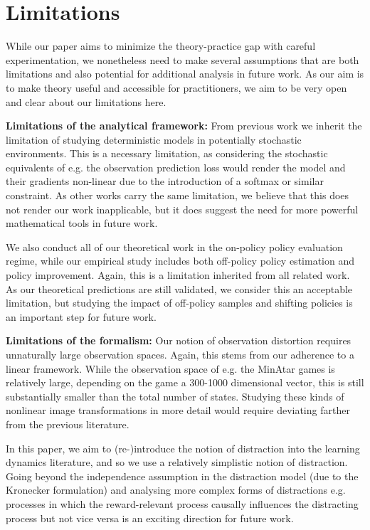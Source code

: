 \section{Limitations}
\label{app:limitations}

While our paper aims to minimize the theory-practice gap with careful experimentation, we nonetheless need to make several assumptions that are both limitations and also potential for additional analysis in future work.
As our aim is to make theory useful and accessible for practitioners, we aim to be very open and clear about our limitations here.

\textbf{Limitations of the analytical framework:} From previous work \parencite{tang2022understanding,lelan2023bootstrapped} we inherit the limitation of studying deterministic models in potentially stochastic environments.
This is a necessary limitation, as considering the stochastic equivalents of e.g. the observation prediction loss would render the model and their gradients non-linear due to the introduction of a softmax or similar constraint.
As other works carry the same limitation, we believe that this does not render our work inapplicable, but it does suggest the need for more powerful mathematical tools in future work.

We also conduct all of our theoretical work in the on-policy policy evaluation regime, while our empirical study includes both off-policy policy estimation and policy improvement.
Again, this is a limitation inherited from all related work.
As our theoretical predictions are still validated, we consider this an acceptable limitation, but studying the impact of off-policy samples and shifting policies is an important step for future work.

\textbf{Limitations of the formalism:} Our notion of observation distortion requires unnaturally large observation spaces. Again, this stems from our adherence to a linear framework.
While the observation space of e.g. the MinAtar games is relatively large, depending on the game a 300-1000 dimensional vector, this is still substantially smaller than the total number of states.
Studying these kinds of nonlinear image transformations in more detail would require deviating farther from the previous literature.

In this paper, we aim to (re-)introduce the notion of distraction into the learning dynamics literature, and so we use a relatively simplistic notion of distraction.
Going beyond the independence assumption in the distraction model (due to the Kronecker formulation) and analysing more complex forms of distractions e.g. processes in which the reward-relevant process causally influences the distracting process but not vice versa is an exciting direction for future work.
